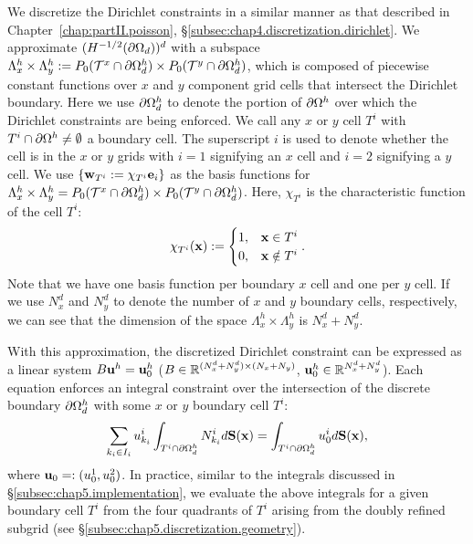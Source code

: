 We discretize the Dirichlet constraints in a similar manner as that described in Chapter~\ref{chap:partII.poisson}, \S\ref{subsec:chap4.discretization.dirichlet}. We approximate $(H^{-1/2}(\partial\Omega_d))^d$ with a subspace $\Lambda_x^h \times \Lambda_y^h := P_0(\mathcal{T}^{x} \cap \partial\Omega_d^h) \times P_0(\mathcal{T}^y \cap \partial\Omega_d^h)$, which is composed of piecewise constant functions over $x$ and $y$ component grid cells that intersect the Dirichlet boundary. Here we use $\partial\Omega_d^h$ to denote the portion of $\partial\Omega^h$ over which the Dirichlet constraints are being enforced. We call any $x$ or $y$ cell $T^i$ with $T^i \cap \partial\Omega^h \neq \emptyset$ a boundary cell. The superscript $i$ is used to denote whether the cell is in the $x$ or $y$ grids with $i = 1$ signifying an $x$ cell and $i = 2$ signifying a $y$ cell. We use $\left\lbrace \mathbf{w}_{T^i} := \chi_{T^i} \mathbf{e}_i \right\rbrace$ as the basis functions for $\Lambda_x^h \times \Lambda_y^h = P_0(\mathcal{T}^x \cap \partial\Omega_d^h) \times P_0(\mathcal{T}^y \cap \partial\Omega_d^h)$. Here, $\chi_{T^i}$ is the characteristic function of the cell $T^i$:
\begin{equation*}
\chi_{T^i}(\mathbf{x}) := \begin{cases} 1, & \mathbf{x} \in T^i \\ 0, & \mathbf{x} \notin T^i \end{cases}.
\end{equation*}
Note that we have one basis function per boundary $x$ cell and one per $y$ cell. If we use $N^d_x$ and $N^d_y$ to denote the number of $x$ and $y$ boundary cells, respectively, we can see that the dimension of the space $\Lambda_x^h \times \Lambda_y^h$ is $N^d_x + N^d_y$.

With this approximation, the discretized Dirichlet constraint can be expressed as a linear system $B \mathbf{u}^h = \mathbf{u}_0^h$ ($B \in \mathbb{R}^{(N^d_x + N^d_y) \times (N_x + N_y)}$, $\mathbf{u}_0^h \in \mathbb{R}^{N^d_x+N^d_y}$). Each equation enforces an integral constraint over the intersection of the discrete boundary $\partial\Omega_d^h$ with some $x$ or $y$ boundary cell $T^i$:
\begin{equation} \label{eq:chap5.dirichlet.constraint.discrete}
\sum_{k_i \in I_i} u^i_{k_i} \int_{T^i \cap \partial\Omega_d^h} N^i_{k_i} d\mathbf{S}(\mathbf{x}) = \int_{T^i \cap \partial\Omega_d^h} u^i_0 d\mathbf{S}(\mathbf{x}),
\end{equation}
where $\mathbf{u}_0 =: (u^1_0,u^2_0)$. In practice, similar to the integrals discussed in \S\ref{subsec:chap5.implementation}, we evaluate the above integrals for a given boundary cell $T^i$ from the four quadrants of $T^i$ arising from the doubly refined subgrid (see \S\ref{subsec:chap5.discretization.geometry}).

